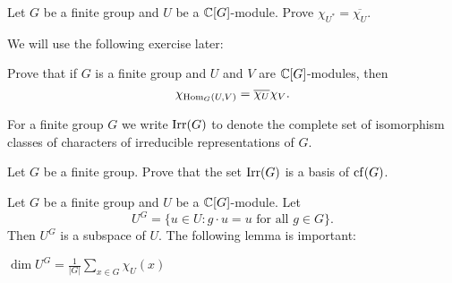 \begin{exercise}
    Let $G$ be a finite group and $U$ be a $\mathbb{C}[G]$-module.
    Prove  $\chi_{U^*}=\overline{\chi_U}$. 
\end{exercise}

We will use the following exercise later:

\begin{exercise}
\label{xca:char_Hom}
    Prove that if $G$ is a finite group and 
    $U$ and $V$ are $\mathbb{C}[G]$-modules, then 
    \[
        \chi_{\operatorname{Hom}_G(U,V)}=\overline{\chi_U}\chi_V.
    \] 
\end{exercise}

For a finite group $G$ we write $\operatorname{Irr}(G)$ to denote
the complete set of isomorphism classes of characters of irreducible representations 
of $G$. 

\begin{exercise}
    Let $G$ be a finite group. Prove that the set
    $\operatorname{Irr}(G)$ is a basis
    of $\operatorname{cf}(G)$. 
\end{exercise}

Let $G$ be a finite group and $U$ be a $\mathbb{C}[G]$-module. 
Let 
\[
U^G=\{u\in U:g\cdot u=u\text{ for all $g\in G$}\}.
\]
Then $U^G$ is a subspace of $U$. The following lemma
is important:

\begin{lemma}
    $\dim U^G=\frac{1}{|G|}\sum_{x\in G}\chi_U(x)$
\end{lemma}

